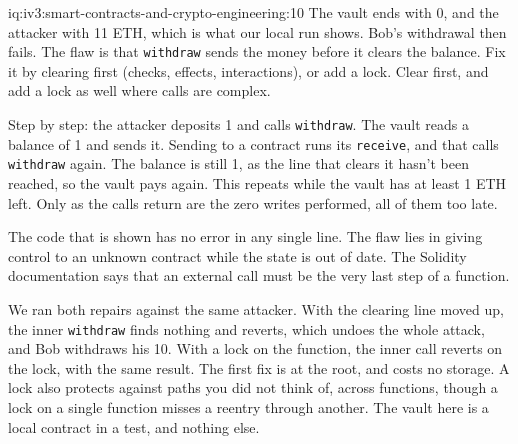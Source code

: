 \begin{solution}{iq:iv3:smart-contracts-and-crypto-engineering:10}
The vault ends with 0, and the attacker with 11 ETH, which is what our local run shows. Bob's withdrawal then fails. The flaw is that \texttt{withdraw} sends the money before it clears the balance. Fix it by clearing first (checks, effects, interactions), or add a lock. Clear first, and add a lock as well where calls are complex.

Step by step: the attacker deposits 1 and calls \texttt{withdraw}. The vault reads a balance of 1 and sends it. Sending to a contract runs its \texttt{receive}, and that calls \texttt{withdraw} again. The balance is still 1, as the line that clears it hasn't been reached, so the vault pays again. This repeats while the vault has at least 1 ETH left. Only as the calls return are the zero writes performed, all of them too late.

The code that is shown has no error in any single line. The flaw lies in giving control to an unknown contract while the state is out of date. The Solidity documentation says that an external call must be the very last step of a function.

We ran both repairs against the same attacker. With the clearing line moved up, the inner \texttt{withdraw} finds nothing and reverts, which undoes the whole attack, and Bob withdraws his 10. With a lock on the function, the inner call reverts on the lock, with the same result. The first fix is at the root, and costs no storage. A lock also protects against paths you did not think of, across functions, though a lock on a single function misses a reentry through another. The vault here is a local contract in a test, and nothing else.

\end{solution}

